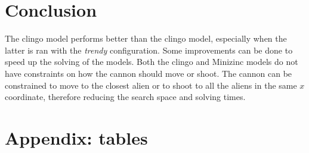 \documentclass[11pt]{article}
\begin{document}
\section{Conclusion}


The clingo model performs better than the clingo model, especially when the latter is ran with the \textit{trendy} configuration.
Some improvements can be done to speed up the solving of the models.
Both the clingo and Minizinc models do not have constraints on how the cannon should move or shoot.
The cannon can be constrained to move to the closest alien or to shoot to all the aliens in the same $x$ coordinate, therefore reducing the search space and solving times.

\printbibliography

\newpage
\section{Appendix: tables}
\end{document}
